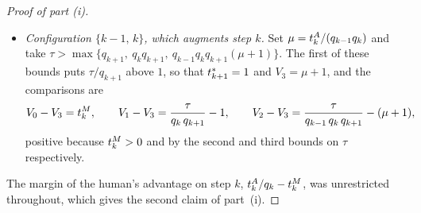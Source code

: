 \begin{proof}[Proof of part (i)]
\begin{itemize}
\item \emph{Configuration $\{k-1,\, k\}$, which augments step $k$.}
Set $\mu = t^{A}_{k}/(q_{k-1} q_k)$ and take $\tau > \max\{q_{k+1},\ q_k q_{k+1},\ q_{k-1} q_k q_{k+1} (\mu+1)\}$.
The first of these bounds puts $\tau/q_{k+1}$ above $1$, so that $t^*_{k+1} = 1$ and $V_3 = \mu + 1$, and the comparisons are
\[
V_0 - V_3 = t^{M}_{k}, \qquad
V_1 - V_3 = \frac{\tau}{q_k\, q_{k+1}} - 1, \qquad
V_2 - V_3 = \frac{\tau}{q_{k-1}\, q_k\, q_{k+1}} - (\mu + 1),
\]
positive because $t^{M}_{k} > 0$ and by the second and third bounds on $\tau$ respectively.
\end{itemize}

The margin of the human's advantage on step $k$, $t^{A}_{k}/q_k - t^{M}_{k}$, was unrestricted throughout, which gives the second claim of part~(i).
\end{proof}

